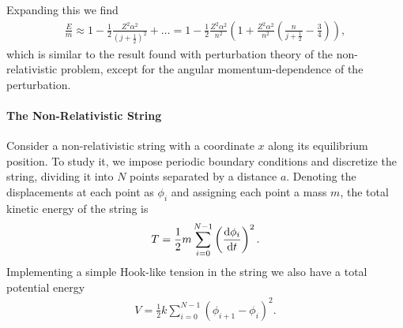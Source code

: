 Expanding this we find
\begin{align*}
	\frac{E}{m} \approx 1 - \frac{1}{2}\frac{Z^{2}\alpha^{2}}{\left(j + \frac{1}{2}\right)^{2}} + \dots = 1 - \frac{1}{2}\frac{Z^{2}\alpha^{2}}{n^{2}}\left(1 + \frac{Z^{2}\alpha^{2}}{n^{2}}\left(\frac{n}{j + \frac{1}{2}} - \frac{3}{4}\right)\right),
\end{align*}
which is similar to the result found with perturbation theory of the non-relativistic problem, except for the angular momentum-dependence of the perturbation.

\paragraph{The Non-Relativistic String}
Consider a non-relativistic string with a coordinate $x$ along its equilibrium position. To study it, we impose periodic boundary conditions and discretize the string, dividing it into $N$ points separated by a distance $a$. Denoting the displacements at each point as $\phi_{i}$ and assigning each point a mass $m$, the total kinetic energy of the string is
\begin{align*}
	T = \frac{1}{2}m\sum\limits_{i = 0}^{N - 1}\left(\dv{\phi_{i}}{t}\right)^{2}.
\end{align*}
Implementing a simple Hook-like tension in the string we also have a total potential energy
\begin{align*}
	V = \frac{1}{2}k\sum\limits_{i = 0}^{N - 1}\left(\phi_{i + 1} - \phi_{i}\right)^{2}.
\end{align*}

